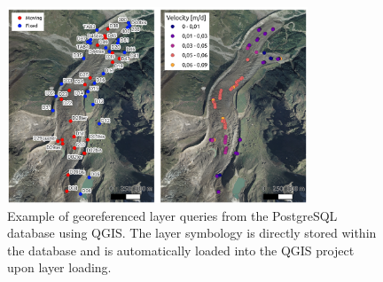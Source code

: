 \begin{figure}[ht]
  \centering
  \includegraphics[width=0.8\textwidth]{db_qgis_query.png}
    \caption{Example of georeferenced layer queries from the PostgreSQL database using QGIS. The layer symbology is directly stored within the database and is automatically loaded into the QGIS project upon layer loading.}  \label{fig:3:db_qgis_query}
\end{figure}

\makechapterbibliography{}

